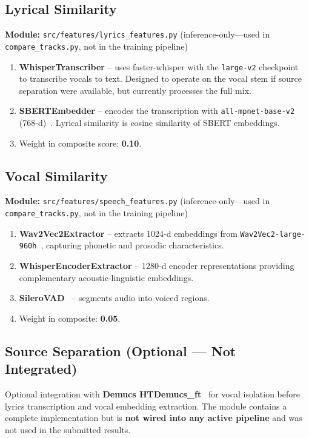 \documentclass[11pt,a4paper]{article}
\begin{document}
\subsection{Lyrical Similarity}

\textbf{Module:} \texttt{src/features/lyrics\_features.py} (inference-only---used in \texttt{compare\_tracks.py}, not in the training pipeline)

\begin{enumerate}[nosep]
  \item \textbf{WhisperTranscriber} -- uses faster-whisper with the \texttt{large-v2} checkpoint~\cite{A7} to transcribe vocals to text. Designed to operate on the vocal stem if source separation were available, but currently processes the full mix.
  \item \textbf{SBERTEmbedder} -- encodes the transcription with \texttt{all-mpnet-base-v2} (768-d)~\cite{A8}. Lyrical similarity is cosine similarity of SBERT embeddings.
  \item Weight in composite score: \textbf{0.10}.
\end{enumerate}

\subsection{Vocal Similarity}

\textbf{Module:} \texttt{src/features/speech\_features.py} (inference-only---used in \texttt{compare\_tracks.py}, not in the training pipeline)

\begin{enumerate}[nosep]
  \item \textbf{Wav2Vec2Extractor} -- extracts 1024-d embeddings from \texttt{Wav2Vec2-large-960h}~\cite{A6}, capturing phonetic and prosodic characteristics.
  \item \textbf{WhisperEncoderExtractor} -- 1280-d encoder representations providing complementary acoustic-linguistic embeddings.
  \item \textbf{SileroVAD}~\cite{C3} -- segments audio into voiced regions.
  \item Weight in composite: \textbf{0.05}.
\end{enumerate}

\subsection{Source Separation (Optional --- Not Integrated)}

Optional integration with \textbf{Demucs HTDemucs\_ft}~\cite{C2} for vocal isolation before lyrics transcription and vocal embedding extraction. The module contains a complete implementation but is \textbf{not wired into any active pipeline} and was not used in the submitted results.
\end{document}
